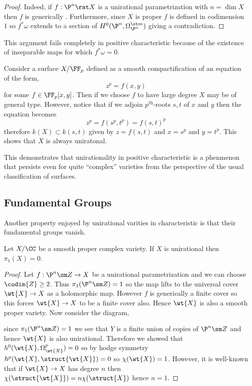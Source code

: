 \documentclass[12pt]{article}
\begin{document}
\begin{proof}
Indeed, if $f : \P^n \rat X$ is a unirational parametrization with $n = \dim{X}$ then $f$ is generically \etale. Furthermore, since $X$ is proper $f$ is defined in codimension $1$ so $f^* \omega$ extends to a section of $H^0(\P^n, \Omega_{\P^n}^{\ot m})$ giving a contradiction. 
\end{proof}

This argument fails completely in positive characteristic because of the existence of inseparable maps for which $f^* \omega = 0$.

\begin{example}
Consider a surface $X / \FF_p$ defined as a smooth compactification of an equation of the form,
\[ z^p = f(x,y) \]
for some $f \in \FF_p[x,y]$. Then if we choose $f$ to have large degree $X$ may be of general type. However, notice that if we adjoin $p^{\text{th}}$-roots $s,t$ of $x$ and $y$ then the equation becomes
\[ z^p = f(s^p, t^p) = f(s,t)^p \]
therefore $k(X) \subset k(s,t)$ given by $z = f(s,t)$ and $x = s^p$ and $y = t^p$. This shows that $X$ is always uniratonal. 
\end{example}

This demonstrates that unirationality in positive characteristic is a phenmenon that persists even for quite ``complex'' varieties from the perspective of the usual classification of surfaces. 

\subsection{Fundamental Groups}

Another property enjoyed by unirational varities in characteristic is that their fundamental groups vanish.

\begin{prop}
Let $X / \CC$ be a smooth proper complex variety. If $X$ is unirational then $\pi_1(X) = 0$.
\end{prop} 

\begin{proof}
Let $f : \P^n \sm Z \to X$ be a unirational parametrization and we can choose $\codim{Z} \ge 2$. Thus $\pi_1(\P^n \sm Z) = 1$ so the map lifts to the universal cover $\wt{X} \to X$ as a holomorphic map. However $f$ is generically a finite cover so this forces $\wt{X} \to X$ to be a finite cover also. Hence $\wt{X}$ is also a smooth proper variety. Now consider the diagram,
\begin{center}
\end{center}
since $\pi_1(\P^n \sm Z) = 1$ we see that $Y$ is a finite union of copies of $\P^n \sm Z$ and hence $\wt{X}$ is also unirational. Therefore we showed that $h^0(\wt{X}, \Omega_{\wt{X}}^p) = 0$ so by hodge symmetry $h^p(\wt{X}, \struct{\wt{X}}) = 0$ so $\chi(\wt{X}) = 1$. However, it is well-known that if $\wt{X} \to X$ has degree $n$ then $\chi(\struct{\wt{X}}) = n \chi(\struct{X})$ hence $n = 1$. 
\end{proof}
\end{document}
